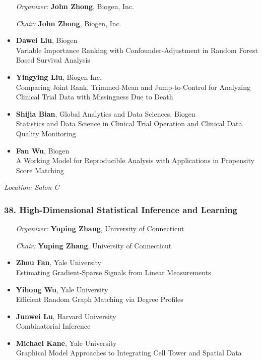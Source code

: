 \begin{enumerate}[align=left]
\item [\emph{Organizer:}] \textbf{John Zhong}, Biogen, Inc.
\item [\emph{Chair:}] \textbf{John Zhong}, Biogen, Inc.
\end{enumerate}

\begin{itemize}
\item \textbf{Dawei Liu}, Biogen \\
Variable Importance Ranking with Confounder-Adjustment in Random Forest Based Survival Analysis
\item \textbf{Yingying Liu}, Biogen Inc. \\
Comparing Joint Rank, Trimmed-Mean and Jump-to-Control for Analyzing Clinical Trial Data with Missingness Due to Death
\item \textbf{Shijia Bian}, Global Analytics and Data Sciences, Biogen \\
Statistics and Data Science in Clinical Trial Operation and Clinical Data Quality Monitoring
\item \textbf{Fan Wu}, Biogen \\
A Working Model for Reproducible Analysis with Applications in Propensity Score Matching
\end{itemize}

\emph{Location: Salon C}

\subsubsection*{38. High-Dimensional Statistical Inference and Learning}

\begin{enumerate}[align=left]
\item [\emph{Organizer:}] \textbf{Yuping Zhang}, University of Connecticut
\item [\emph{Chair:}] \textbf{Yuping Zhang}, University of Connecticut
\end{enumerate}

\begin{itemize}
\item \textbf{Zhou Fan}, Yale University \\
Estimating Gradient-Sparse Signals from Linear Measurements
\item \textbf{Yihong Wu}, Yale University \\
Efficient Random Graph Matching via Degree Profiles
\item \textbf{Junwei Lu}, Harvard University \\
Combinatorial Inference
\item \textbf{Michael Kane}, Yale University \\
Graphical Model Approaches to Integrating Cell Tower and Spatial Data
\end{itemize}


